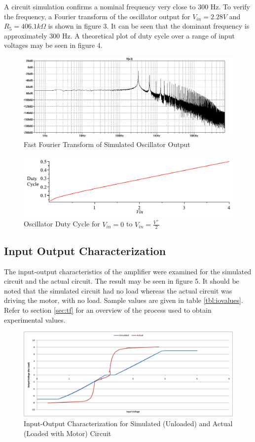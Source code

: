 A circuit simulation confirms a nominal frequency very close to 300 Hz.
To verify the frequency, a Fourier transform of the oscillator output for $V_{in} = 2.28 V$ and $R_5 = 406.1 k\Omega$ is shown in figure 3. 
It can be seen that the dominant frequency is approximately 300 Hz.
A theoretical plot of duty cycle over a range of input voltages may be seen in figure 4.

\begin{figure}[h]
    \label{fig:FFT}
    \centering
    \includegraphics[width=.70\textwidth,bb=0 0 1056 406]{images/FFT.png}
    \caption{Fast Fourier Transform of Simulated Oscillator Output}
\end{figure}

\begin{figure}[h]
    \label{fig:dutycycle}
    \centering
    \includegraphics[width=.70\textwidth]{images/dutycycle.pdf}
    \caption{Oscillator Duty Cycle for $V_{in} = 0$ to $V_{in} = {\frac {V^+}{2}}$}
\end{figure}

\subsection{Input Output Characterization}

The input-output characteristics of the amplifier were examined for the simulated circuit and the actual circuit.
The result may be seen in figure 5.
It should be noted that the simulated circuit had no load whereas the actual circuit was driving the motor, with no load.
Sample values are given in table \ref{tbl:iovalues}.
Refer to section \ref{sec:tf} for an overview of the process used to obtain experimental values.

\begin{figure}[h]
    \label{fig:io}
    \centering
    \includegraphics[width=.70\textwidth,bb=0 0 1149 467]{images/OutputVoltage.png}
    \caption{Input-Output Characterization for Simulated (Unloaded) and Actual (Loaded with Motor) Circuit}
\end{figure}

